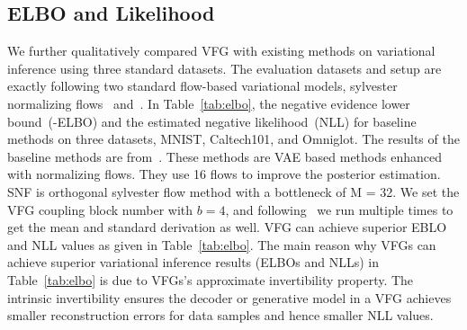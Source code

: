 \documentclass[twoside]{article}
\begin{document}
\subsection{ELBO and Likelihood}\label{sec:exp:elbo}
We further qualitatively compared VFG with existing methods on variational inference using three standard datasets.
The evaluation datasets and setup are exactly following two standard flow-based variational models, sylvester normalizing flows~\cite{berg2018sylvester} and~\cite{rezende2015variational}. In Table~\ref{tab:elbo}, the negative evidence lower bound~(-ELBO) and the estimated negative likelihood~(NLL) for baseline methods on three datasets, MNIST, Caltech101, and Omniglot. The results of the baseline methods are from~\cite{berg2018sylvester}. These methods are VAE based methods  enhanced with  normalizing flows.  They use 16 flows to improve the posterior estimation. SNF is orthogonal sylvester flow method with a bottleneck of M = 32. We set the VFG coupling block number with  $b=4$, and following~\cite{berg2018sylvester} we run multiple times to get the mean and standard derivation as well. VFG can achieve superior EBLO and NLL values as given in Table~\ref{tab:elbo}.  The main reason why VFGs can achieve superior variational inference results (ELBOs and  NLLs) in Table~\ref{tab:elbo} is due to VFGs's approximate invertibility property. The intrinsic invertibility ensures the decoder or generative model in a VFG  achieves smaller reconstruction errors for data samples and hence smaller NLL values.


\end{document}
